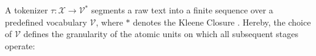 A tokenizer $\tau : \mathcal{X} \to \mathcal{V}^*$ segments a raw text into a finite sequence over a predefined vocabulary $\mathcal{V}$, where $*$ denotes the Kleene Closure \cite[p. 4 f.]{Jurafsky2024_SLP}. Hereby, the choice of $\mathcal{V}$ defines the granularity of the atomic units on which all subsequent stages operate:




